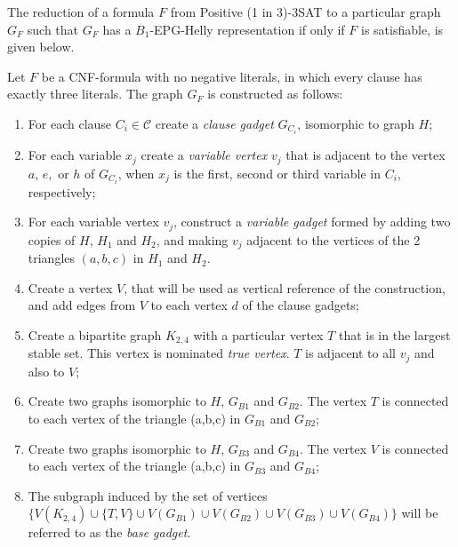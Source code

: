 \documentclass[runningheads]{llncs}
\begin{document}
The reduction of a formula $F$ from  {\sc Positive (1 in 3)-3SAT}  to a particular graph $G_F$ such that $G_F$ has a $B_{1}$-EPG-Helly representation if only if $F$ is satisfiable, is given below.

\begin{definition}\label{sec:reducao}
Let $F$ be a CNF-formula with no negative literals, in which every clause has exactly three literals. The graph $G_F$ is constructed as follows:

\begin{enumerate}
\item For each clause $C_i \in \mathcal{C}$ create a  \textit{clause gadget} $G_{C_i}$, isomorphic to  graph $H$;

\item For each variable $x_{j}$ create a \emph{variable vertex} $v_{j}$ that is adjacent to the vertex $a$, $e,$ or $h$ of $G_{C_i}$, when $x_{j}$ is the first, second or third variable in $C_i$, respectively;

\item For each variable vertex $v_{j}$, construct a \emph{variable gadget} formed by adding two copies of $H$, $H_1$ and $H_2$, and making $v_j$ adjacent to the vertices of the 2 triangles $(a, b, c)$ in  $H_1$ and $H_2$.



\item Create a vertex $V$, that will be used as vertical reference of the construction, and add edges from $V$ to each vertex  $d$ of the clause gadgets;%

\item Create a bipartite graph $K_{2,4}$ with a particular vertex $T$ that is in the largest stable set. This vertex is nominated \emph{true vertex}. $T$ is adjacent to all $v_{j}$ and also to $V$;

\item Create two  graphs isomorphic to $H$, $G_{B1}$ and $G_{B2}$. The vertex $T$ is connected to each vertex of the triangle (a,b,c) in $G_{B1}$ and $G_{B2}$;


\item Create two graphs isomorphic  to $H$, $G_{B3}$ and $G_{B4}$. The vertex $V$ is connected to each vertex of the triangle (a,b,c) in $G_{B3}$ and $G_{B4}$;

\item The  subgraph induced by the set of vertices $\{V(K_{2,4}) \cup  \{T, V\} \cup V(G_{B1}) \cup V(G_{B2}) \cup V(G_{B3}) \cup V(G_{B4})\}$ will be referred to as the  \emph{base gadget}. 
\end{enumerate}
\end{definition}
\end{document}
